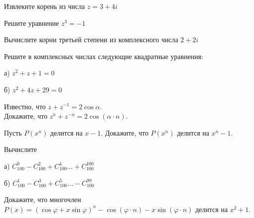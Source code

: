 \documentclass{article}
\begin{document}
    \begin{task_boxed}
        Извлеките корень из числа $z=3+4i$
    \end{task_boxed}

    \begin{task_boxed}
        Решите уравнение $z^3=-1$
    \end{task_boxed}

    \begin{task_boxed}
        Вычислите корни третьей степени из комплексного числа $2+2i$
    \end{task_boxed}

    \begin{task_boxed}
        Решите в комплексных числах следующие квадратные уравнения:

        а)  $z^2 + z + 1 = 0$

        б)  $z^2 + 4z + 29 = 0$

    \end{task_boxed}

    \begin{task_boxed}
        Известно, что  $z + z^{-1} = 2\cos{\alpha}$.\\
        Докажите, что  $z^n + z^{-n} = 2\cos{(\alpha \cdot n)}$.
    \end{task_boxed}

    \begin{task_boxed}
        Пусть $P(x^n)$ делится на  $x - 1$.
        Докажите, что $P(x^n)$ делится на  $x^n - 1$.
    \end{task_boxed}

    \begin{task_boxed}
        Вычислите

        а) $C_{100}^0 - C_{100}^2 + C_{100}^4 \dots + C_{100}^{100} $

        б) $C_{100}^1 - C_{100}^3 + C_{100}^5 \dots - C_{100}^{99} $
    \end{task_boxed}
    \begin{task_boxed}
        Докажите, что многочлен  $P(x) = (\cos{\varphi} + x\sin{\varphi})^n - \cos{(\varphi\cdot n)} - x\sin{(\varphi\cdot n)}$  делится на  $x^2 + 1$.
    \end{task_boxed}

%	
%
%	
\end{document}
